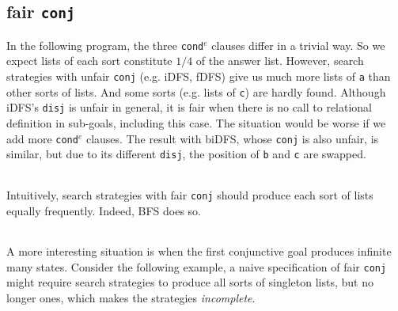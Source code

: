 \documentclass[format=acmlarge, review=true, authordraft=true]{acmart}
\newcommand{\conde}{\texttt{cond$^e$} }
\newcommand{\conj}{\texttt{conj}}
\newcommand{\disj}{\texttt{disj}}
\begin{document}
\begin{center}
	\begin{tabular}{c}
		
	\end{tabular}
\end{center}

\subsection{fair \texttt{conj}}

In the following program, the three \conde clauses differ in a trivial way. So 
we expect lists of each sort constitute $1/4$ of the answer list. However, 
search strategies with unfair \conj{} (e.g. iDFS, fDFS) give us much 
more lists of \texttt{a} than other sorts of lists. And some sorts (e.g. lists 
of \texttt{c}) are hardly found. Although iDFS's \disj{} is unfair in general, 
it is fair when there is no call to relational definition in sub-goals, 
including this case. The situation would be worse if we add more \conde 
clauses. The result with biDFS, whose \conj{} is also unfair, is similar, but 
due to its different \disj{}, the position of \texttt{b} and \texttt{c} are 
swapped. 

\begin{center}
	\begin{tabular}{c}
		
	\end{tabular}
\end{center}

Intuitively, search strategies with fair \conj{} should produce each sort of 
lists equally frequently. Indeed, BFS does so.

\begin{center}
	\begin{tabular}{c}
		
	\end{tabular}
\end{center}

A more interesting situation is when the first conjunctive goal produces 
infinite many states. Consider the following example, a naive specification of 
fair \conj{} might require search strategies to produce all sorts of singleton 
lists, but no longer ones, which makes the strategies \emph{incomplete}. 

\begin{center}
	\begin{tabular}{c}
		
	\end{tabular}
\end{center}
\end{document}
